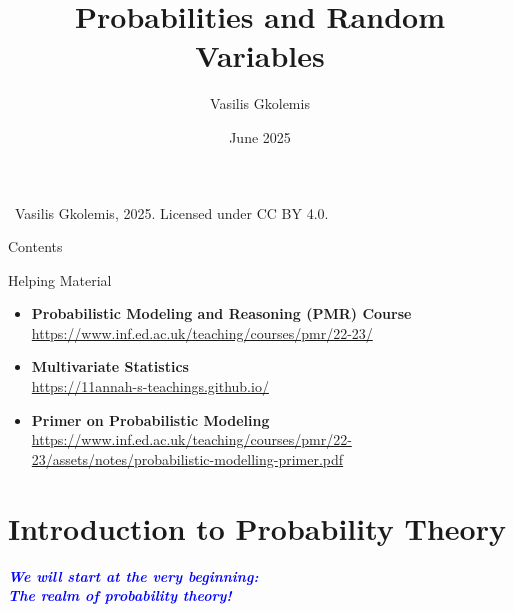 \documentclass{beamer}
\title{Probabilities and Random Variables}
\author{Vasilis Gkolemis}
\institute{ATHENA RC | HUA}
\date{June 2025}
\begin{document}

\begin{frame}
  \titlepage
  \vfill
  \footnotesize
  \textcopyright\
  Vasilis Gkolemis, 2025. Licensed under CC BY 4.0.
\end{frame}

\begin{frame}{Contents}
  \tableofcontents
\end{frame}


\begin{frame}{Helping Material}
  \begin{itemize}
  \item \textbf{Probabilistic Modeling and Reasoning (PMR) Course}
    \url{https://www.inf.ed.ac.uk/teaching/courses/pmr/22-23/}
  \item \textbf{Multivariate Statistics}\\
    \url{https://11annah-s-teachings.github.io/}
  \item \textbf{Primer on Probabilistic Modeling}
    \url{https://www.inf.ed.ac.uk/teaching/courses/pmr/22-23/assets/notes/probabilistic-modelling-primer.pdf}
  \end{itemize}
\end{frame}


\section{Introduction to Probability Theory}

\begin{frame}{}
    \begin{center}
        \textcolor{blue}{\bfseries \emph{We will start at the very beginning: \\
The realm of probability theory!}}
    \end{center}
\end{frame}
\end{document}

